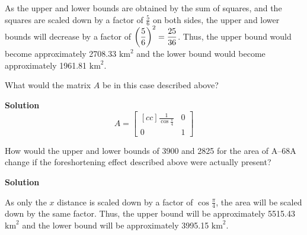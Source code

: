 \documentclass[11pt]{scrartcl}
\theoremstyle{dotlessP}
\theoremstyle{dotlessN}
\DeclarePairedDelimiter\paren{(}{)} %
\begin{document}
As the upper and lower bounds are obtained by the sum of squares, and the squares are scaled down by a factor of $\displaystyle\frac{5}{6}$ on both sides, the upper and lower bounds will decrease by a factor of  $\paren*{\displaystyle\frac{5}{6}}^2 = \displaystyle\frac{25}{36}$. Thus, the upper bound would become approximately 2708.33 $\text{km}^2$ and the lower bound would become approximately 1961.81 $\text{km}^2$.
\begin{ques}
	What would the matrix $A$ be in this case described above?
\end{ques}
\textbf{Solution}
\[
A = 
\begin{bmatrix}[cc]
	\displaystyle\frac{1}{\cos \frac{\pi}{4}} & 0 \\
	0 & 1 
\end{bmatrix}
\] 
\begin{ques}
	How would the upper and lower bounds of 3900 and 2825 for the area of A--68A change if the foreshortening effect described above were actually present?	
\end{ques}
\textbf{Solution}

As only the $x$ distance is scaled down by a factor of $\cos \displaystyle \frac{\pi}{4}$, the area will be scaled down by the same factor. Thus, the upper bound will be approximately 5515.43 $\text{km}^2$ and the lower bound will be approximately 3995.15 $\text{km}^2$.
\end{document}
